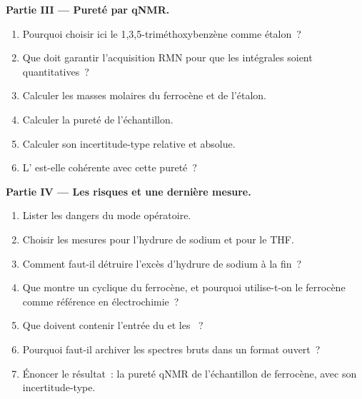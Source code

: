\begin{problem}
\medskip\noindent\textbf{Partie III --- Pureté par qNMR.}
\begin{enumerate}[resume]
  \item Pourquoi choisir ici le 1,3,5-triméthoxybenzène comme étalon~?
  \item Que doit garantir l'acquisition RMN pour que les intégrales soient
        quantitatives~?
  \item Calculer les masses molaires du ferrocène et de l'étalon.
  \item Calculer la pureté de l'échantillon.
  \item Calculer son incertitude-type relative et absolue.
  \item L' est-elle cohérente avec cette pureté~?
\end{enumerate}

\medskip\noindent\textbf{Partie IV --- Les risques et une dernière mesure.}
\begin{enumerate}[resume]
  \item Lister les dangers du mode opératoire.
  \item Choisir les mesures pour l'hydrure de sodium et pour le THF.
  \item Comment faut-il détruire l'excès d'hydrure de sodium à la fin~?
  \item Que montre un  cyclique du ferrocène, et pourquoi
        utilise-t-on le ferrocène comme référence en électrochimie~?
  \item Que doivent contenir l'entrée du  et les
        ~?
  \item Pourquoi faut-il archiver les spectres bruts dans un format ouvert~?
  \item Énoncer le résultat~: la pureté qNMR de l'échantillon de ferrocène,
        avec son incertitude-type.
\end{enumerate}
\end{problem}
